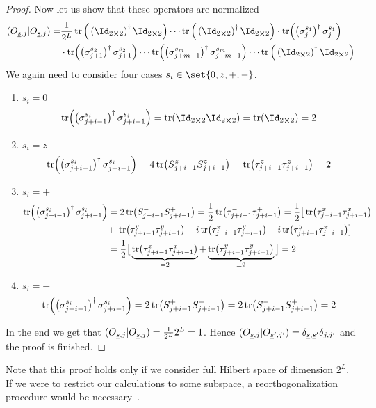\begin{proof}
    Now let us show that these operators are normalized
    \begin{align}
        \hs{O_{\underline{s},j}}{O_{\underline{s},j}} =& \frac{1}{2^L} 
        \tr\Big(\left(\Id_{2\cross 2}\right)^{\dagger}\Id_{2\cross 2}\Big) \cdots 
        \tr\Big(\left(\Id_{2\cross 2}\right)^{\dagger}\Id_{2\cross 2}\Big)
        \cdot \tr(\left(\sigma_j^{s_1}\right)^{\dagger} \sigma_j^{s_1})\nonumber\\ 
        &\cdot \tr(\left(\sigma_{j+1}^{s_2}\right)^{\dagger} \sigma_{j+1}^{s_2})
        \cdots \tr(\left(\sigma_{j+m-1}^{s_m}\right)^{\dagger} \sigma_{j+m-1}^{s_m}) \cdots 
        \tr\Big(\left(\Id_{2\cross 2}\right)^{\dagger}\Id_{2\cross 2}\Big)
    \end{align}
    We again need to consider four cases \(s_i\in \set{0,z,+,-}\).
    \begin{enumerate}
        \item {\(s_i = 0\)
        \begin{equation*}
            \tr(\left(\sigma_{j+i-1}^{s_i}\right)^{\dagger} \sigma_{j+i-1}^{s_i}) = \tr(\Id_{2\cross 2}\Id_{2\cross 2}) = 
            \tr(\Id_{2\cross 2}) = 2
        \end{equation*}
        }
        \item {\(s_i = z\)
        \begin{equation*}
            \tr(\left(\sigma_{j+i-1}^{s_i}\right)^{\dagger} \sigma_{j+i-1}^{s_i}) = 4\tr(S^{z}_{j+i-1} S^{z}_{j+i-1}) = 
            \tr(\tau_{j+i-1}^{z} \tau_{j+i-1}^{z}) = 2
        \end{equation*}
        }
        \item { \(s_i = +\)
        \begin{align*}
            \tr(\left(\sigma_{j+i-1}^{s_i}\right)^{\dagger} \sigma_{j+i-1}^{s_i}) =& \;2\tr(S^{-}_{j+i-1} S^{+}_{j+i-1}) =
            \frac{1}{2} \tr(\tau^{-}_{j+i-1}\tau^{+}_{j+i-1})  
            =\frac{1}{2} \big[\tr(\tau^{x}_{j+i-1}\tau^{x}_{j+i-1})\\
            +\;&\tr(\tau^{y}_{j+i-1}\tau^{y}_{j+i-1})
            - i\tr(\tau^{x}_{j+i-1}\tau^{y}_{j+i-1}) -i\tr(\tau^{y}_{j+i-1}\tau^{x}_{j+i-1})\big] \\
            =&\; \frac{1}{2}\big[  \underbrace{\tr(\tau^{x}_{j+i-1}\tau^{x}_{j+i-1})}_{=2}
            +\underbrace{\tr(\tau^{y}_{j+i-1}\tau^{y}_{j+i-1})}_{=2} \big] = 2
        \end{align*}
        }
        \item { \(s_i = -\)
        \begin{align*}
            \tr(\left(\sigma_{j+i-1}^{s_i}\right)^{\dagger} \sigma_{j+i-1}^{s_i}) =
             2\tr(S^{+}_{j+i-1} S^{-}_{j+i-1}) = 2\tr(S^{-}_{j+i-1} S^{+}_{j+i-1}) = 2 
        \end{align*}
        }
    \end{enumerate}
    In the end we get that \((O_{\underline{s},j} | O_{\underline{s},j}) = \frac{1}{2^L}2^L = 1\).
    Hence \( (O_{\underline{s},j} | O_{\underline{s}^{\prime},j^{\prime}})
    =\delta_{\underline{s},\underline{s}^{\prime}}\delta_{j,j^{\prime}}\) and the proof is finished.
\end{proof}
Note that this proof holds only if we consider full Hilbert space of dimension \(2^L\).
If we were to restrict our calculations to some subspace, a reorthogonalization procedure
would be necessary~\autocite{Mierzejewski2015a}.